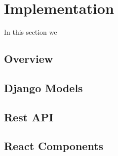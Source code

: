 \chapter{Implementation}
\label{chapter:implementation}

In this section we 

\section{Overview}
\label{sec:overview}

\section{Django Models}
\label{sec:django-models}

\section{Rest API}
\label{sec:api}

\section{React Components}
\label{sec:react0components}
